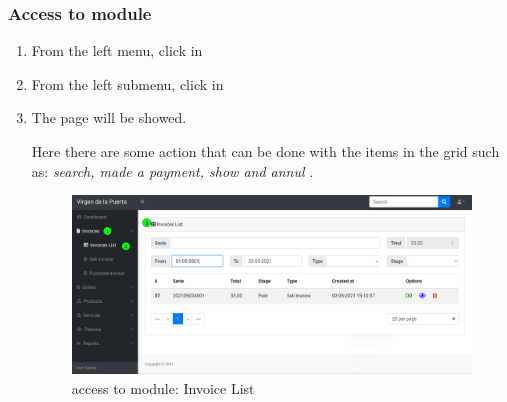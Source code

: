 \documentclass[a4paper,11pt]{refart}
\begin{document}
\subsubsection{Access to module}
\begin{enumerate}
	\item From the left menu, click in  
	\item From the left submenu, click in  
	\item The page will be showed.
	\medskip
	\begin{leftbar}
		Here there are some action that can be done with the items in the grid such as: \emph{search, made a payment, show and annul} .
	\end{leftbar}
	\begin{figure}[H]\centering
		\includegraphics[width=\textwidth]{images/invoice_list-access.png}
		\caption{access to module: Invoice List}
		\label{fig:invoice_list-access}
	\end{figure}
\end{enumerate}
\end{document}
